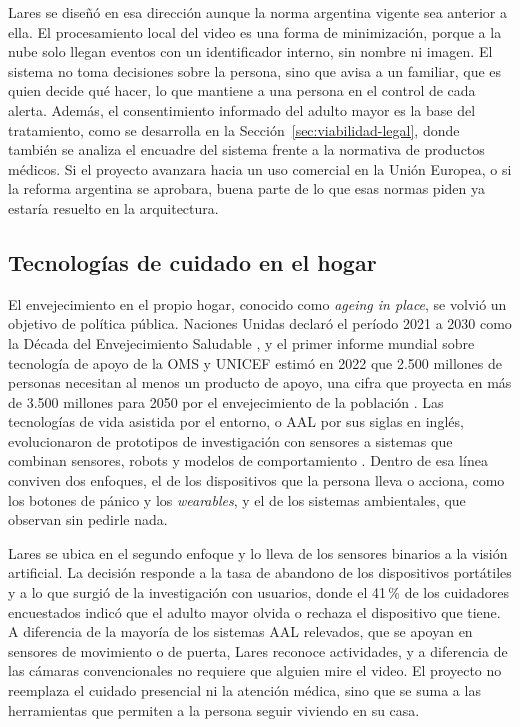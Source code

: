 Lares se diseñó en esa dirección aunque la norma argentina vigente sea anterior a ella.
El procesamiento local del video es una forma de minimización, porque a la nube solo llegan eventos con un identificador interno, sin nombre ni imagen.
El sistema no toma decisiones sobre la persona, sino que avisa a un familiar, que es quien decide qué hacer, lo que mantiene a una persona en el control de cada alerta.
Además, el consentimiento informado del adulto mayor es la base del tratamiento, como se desarrolla en la Sección~\ref{sec:viabilidad-legal}, donde también se analiza el encuadre del sistema frente a la normativa de productos médicos.
Si el proyecto avanzara hacia un uso comercial en la Unión Europea, o si la reforma argentina se aprobara, buena parte de lo que esas normas piden ya estaría resuelto en la arquitectura.

\subsection{Tecnologías de cuidado en el hogar}

El envejecimiento en el propio hogar, conocido como \textit{ageing in place}, se volvió un objetivo de política pública.
Naciones Unidas declaró el período 2021 a 2030 como la Década del Envejecimiento Saludable \parencite{ONU2020}, y el primer informe mundial sobre tecnología de apoyo de la OMS y UNICEF estimó en 2022 que 2.500 millones de personas necesitan al menos un producto de apoyo, una cifra que proyecta en más de 3.500 millones para 2050 por el envejecimiento de la población \parencite{OMS2022}.
Las tecnologías de vida asistida por el entorno, o AAL por sus siglas en inglés, evolucionaron de prototipos de investigación con sensores a sistemas que combinan sensores, robots y modelos de comportamiento \parencite{Rashidi2013}.
Dentro de esa línea conviven dos enfoques, el de los dispositivos que la persona lleva o acciona, como los botones de pánico y los \textit{wearables}, y el de los sistemas ambientales, que observan sin pedirle nada.

Lares se ubica en el segundo enfoque y lo lleva de los sensores binarios a la visión artificial.
La decisión responde a la tasa de abandono de los dispositivos portátiles \parencite{MunozEsquivel2023} y a lo que surgió de la investigación con usuarios, donde el 41\,\% de los cuidadores encuestados indicó que el adulto mayor olvida o rechaza el dispositivo que tiene.
A diferencia de la mayoría de los sistemas AAL relevados, que se apoyan en sensores de movimiento o de puerta, Lares reconoce actividades, y a diferencia de las cámaras convencionales no requiere que alguien mire el video.
El proyecto no reemplaza el cuidado presencial ni la atención médica, sino que se suma a las herramientas que permiten a la persona seguir viviendo en su casa.

